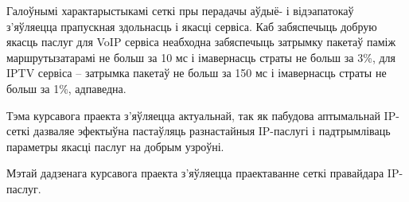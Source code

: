 Галоўнымі характарыстыкамі сеткі пры перадачы аўдыё- і відэапатокаў
з'яўляецца прапускная здольнасць і якасці сервіса.
Каб забяспечыць добрую якасць паслуг для VoIP сервіса
неабходна забяспечыць затрымку пакетаў паміж маршрутызатарамі не больш за
10 мс і імавернасць страты не больш за 3\%, для IPTV сервіса --
затрымка пакетаў не больш за 150 мс і імавернасць страты не больш за 1\%,
адпаведна.

Тэма курсавога праекта з'яўляецца актуальнай, так як пабудова аптымальнай
IP-сеткі дазваляе эфектыўна пастаўляць разнастайныя IP-паслугі і
падтрымліваць параметры якасці паслуг на добрым узроўні.

Мэтай дадзенага курсавога праекта з'яўляецца праектаванне сеткі правайдара
IP-паслуг.

